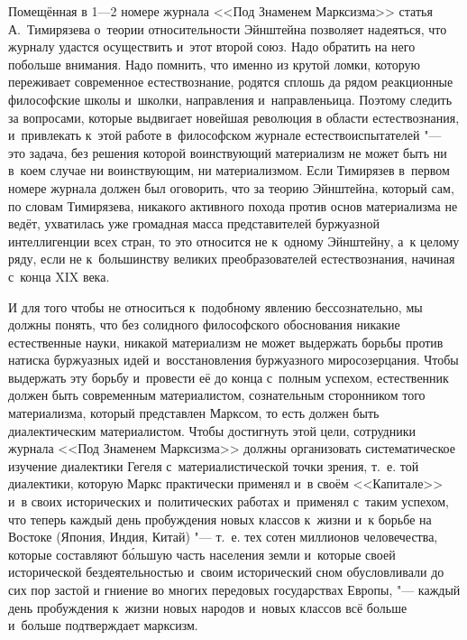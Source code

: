 Помещённая в 1---2 номере журнала <<Под Знаменем Марксизма>> статья
А.~Тимирязева о~теории относительности Эйнштейна позволяет
надеяться, что журналу удастся осуществить и~этот второй союз. Надо
обратить на него побольше внимания. Надо помнить, что именно из крутой
ломки, которую переживает современное естествознание, родятся сплошь да
рядом реакционные философские школы и~школки, направления и~направленьица.
Поэтому следить за вопросами, которые выдвигает новейшая революция в
области естествознания, и~привлекать к~этой работе в~философском журнале
естествоиспытателей "--- это задача, без решения которой воинствующий
материализм не может быть ни в~коем случае ни воинствующим, ни
материализмом. Если Тимирязев в~первом номере журнала должен был оговорить,
что за теорию Эйнштейна, который сам, по словам Тимирязева, никакого
активного похода против основ материализма не ведёт, ухватилась уже
громадная масса представителей буржуазной интеллигенции всех стран, то это
относится не к~одному Эйнштейну, а~к целому ряду, если не к~большинству
великих преобразователей естествознания, начиная с~конца XIX века.

И для того чтобы не относиться к~подобному явлению бессознательно, мы
должны понять, что без солидного философского обоснования никакие
естественные науки, никакой материализм не может выдержать борьбы против
натиска буржуазных идей и~восстановления буржуазного миросозерцания. Чтобы
выдержать эту борьбу и~провести её до конца с~полным успехом, естественник
должен быть современным материалистом, сознательным сторонником того
материализма, который представлен Марксом, то есть должен быть
диалектическим материалистом. Чтобы достигнуть этой цели, сотрудники
журнала <<Под Знаменем Марксизма>> должны организовать систематическое
изучение диалектики Гегеля с~материалистической точки зрения, т.~е. той
диалектики, которую Маркс практически применял и~в своём <<Капитале>> и~в
своих исторических и~политических работах и~применял с~таким успехом, что
теперь каждый день пробуждения новых классов к~жизни и~к борьбе на Востоке
(Япония, Индия, Китай) "--- т.~е. тех сотен миллионов человечества, которые
составляют б\'{о}льшую часть населения земли и~которые своей исторической
бездеятельностью и~своим исторический сном обусловливали до сих пор застой
и гниение во многих передовых государствах Европы, "--- каждый день
пробуждения к~жизни новых народов и~новых классов всё больше и~больше
подтверждает марксизм.

